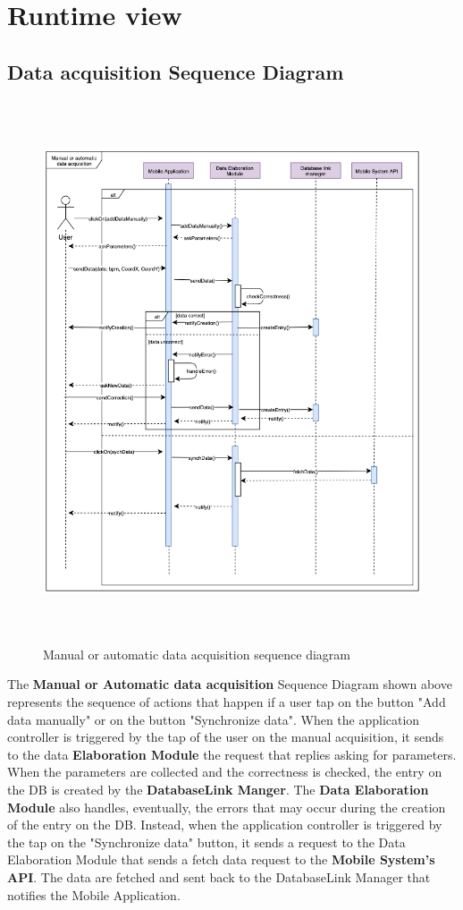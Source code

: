 \documentclass[DD.tex]{subfiles}
\begin{document}
\section{Runtime view}
\subsection{Data acquisition Sequence Diagram}
\begin{figure}[h!]
\centering
\includegraphics[height=16.00cm,keepaspectratio]{Figures/DataAcquisition}
\caption{Manual or automatic data acquisition sequence diagram}
\end{figure}

The \textbf{Manual or Automatic data acquisition} Sequence Diagram shown above represents the sequence of actions that happen if a user tap on the button "Add data manually" or on the button "Synchronize data". \newline
When the application controller is triggered by the tap of the user on the \newline manual acquisition, it sends to the data \textbf{Elaboration Module} the request that replies asking for parameters. 
When the parameters are collected and the correctness is checked, the entry on the DB is created by the \textbf{DatabaseLink Manger}.\newline
The \textbf{Data Elaboration Module} also handles, eventually, the errors that may occur during the creation of the entry on the DB.
Instead, when the application controller is triggered by the tap on the "Synchronize data" button, it sends a request to the Data Elaboration Module that sends a fetch data request to the \textbf{Mobile System's API}. The data are fetched and sent back to the DatabaseLink Manager that notifies the Mobile Application. 
\end{document}
